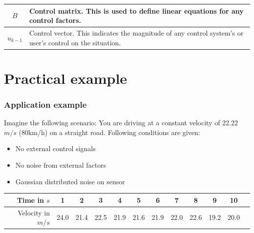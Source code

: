 \documentclass[aspectratio=169]{beamer}
\begin{document}
\begin{frame}
\begin{table}[h]
\begin{tabular}{|c|p{8cm}|}
            \(B\)           & Control matrix. This is used to define linear equations for any control factors.                                                                  \\ \hline
            \(u_{k-1}\)     & Control vector. This indicates the magnitude of any control system's or user's control on the situation.                                          \\ \hline
        \end{tabular}
    \end{table}
\end{frame}

\section{Practical example}

\begin{frame}
    \frametitle{Application example}

    Imagine the following scenario:
    You are driving at a constant velocity of 22.22\(m/s\) (80km/h) on a straight road.
    Following conditions are given:
    \begin{itemize}
        \item No external control signals
        \item No noise from external factors
        \item Gaussian distributed noise on sensor
    \end{itemize}

    \vspace{1em}

    \centering
    \begin{tabular}{ | r | c|c|c|c|c|c|c|c|c|c|c| }
        \hline
        Time in $s$       & 1    & 2    & 3    & 4    & 5    & 6    & 7    & 8    & 9    & 10   \\
        \hline
        Velocity in $m/s$ & 24.0 & 21.4 & 22.5 & 21.9 & 21.6 & 21.9 & 22.0 & 22.6 & 19.2 & 20.0 \\
        \hline
    \end{tabular}
\end{frame}
\end{document}
